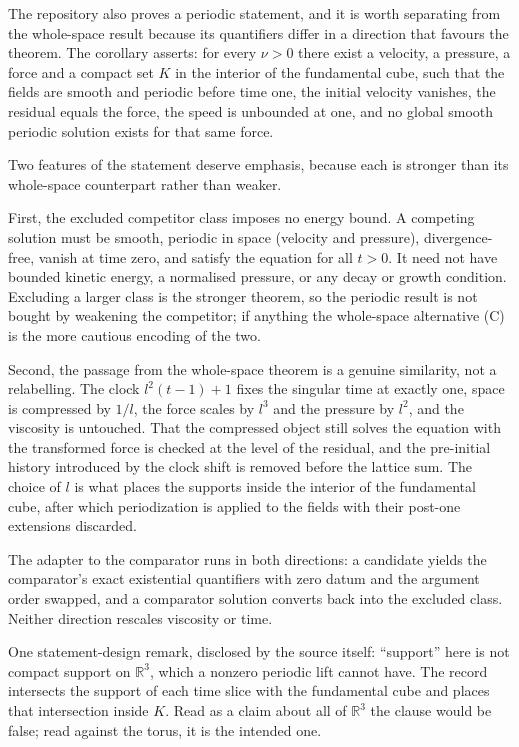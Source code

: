 \documentclass[11pt]{article}
\newcommand{\R}{\mathbb{R}}
\theoremstyle{plain}
\theoremstyle{definition}
\theoremstyle{remark}
\begin{document}
The repository also proves a periodic statement, and it is worth separating from
the whole-space result because its quantifiers differ in a direction that favours
the theorem. The corollary asserts: for every $\nu>0$ there exist a velocity, a
pressure, a force and a compact set $K$ in the interior of the fundamental cube,
such that the fields are smooth and periodic before time one, the initial
velocity vanishes, the residual equals the force, the speed is unbounded at one,
and no global smooth periodic solution exists for that same force.

Two features of the statement deserve emphasis, because each is stronger than its
whole-space counterpart rather than weaker.

First, the excluded competitor class imposes no energy bound. A competing
solution must be smooth, periodic in space (velocity and pressure),
divergence-free, vanish at time zero, and satisfy the equation for all $t>0$. It
need not have bounded kinetic energy, a normalised pressure, or any decay or
growth condition. Excluding a larger class is the stronger theorem, so the
periodic result is not bought by weakening the competitor; if anything the
whole-space alternative (C) is the more cautious encoding of the two.

Second, the passage from the whole-space theorem is a genuine similarity, not a
relabelling. The clock $l^2(t-1)+1$ fixes the singular time at exactly one, space
is compressed by $1/l$, the force scales by $l^3$ and the pressure by $l^2$, and
the viscosity is untouched. That the compressed object still solves the equation
with the transformed force is checked at the level of the residual, and the
pre-initial history introduced by the clock shift is removed before the lattice
sum. The choice of $l$ is what places the supports inside the interior of the
fundamental cube, after which periodization is applied to the fields with their
post-one extensions discarded.

The adapter to the comparator runs in both directions: a candidate yields the
comparator's exact existential quantifiers with zero datum and the argument order
swapped, and a comparator solution converts back into the excluded class. Neither
direction rescales viscosity or time.

One statement-design remark, disclosed by the source itself: ``support'' here is
not compact support on $\R^3$, which a nonzero periodic lift cannot have. The
record intersects the support of each time slice with the fundamental cube and
places that intersection inside $K$. Read as a claim about all of $\R^3$ the
clause would be false; read against the torus, it is the intended one.
\end{document}

